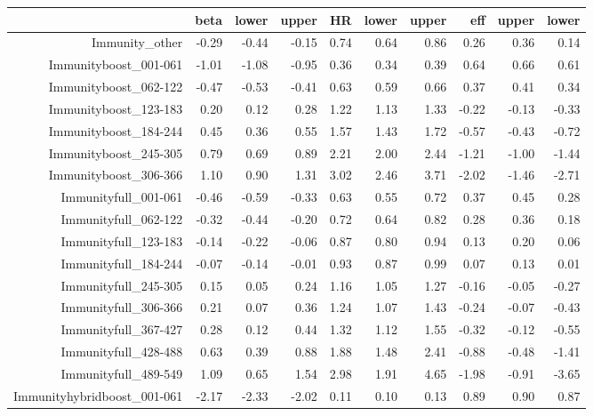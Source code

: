 \begin{table}[ht]
\centering
\begin{tabular}{rrrrrrrrrr}
  \hline
 & beta & lower & upper & HR & lower & upper & eff & upper & lower \\ 
  \hline
Immunity\_other & -0.29 & -0.44 & -0.15 & 0.74 & 0.64 & 0.86 & 0.26 & 0.36 & 0.14 \\ 
  Immunityboost\_001-061 & -1.01 & -1.08 & -0.95 & 0.36 & 0.34 & 0.39 & 0.64 & 0.66 & 0.61 \\ 
  Immunityboost\_062-122 & -0.47 & -0.53 & -0.41 & 0.63 & 0.59 & 0.66 & 0.37 & 0.41 & 0.34 \\ 
  Immunityboost\_123-183 & 0.20 & 0.12 & 0.28 & 1.22 & 1.13 & 1.33 & -0.22 & -0.13 & -0.33 \\ 
  Immunityboost\_184-244 & 0.45 & 0.36 & 0.55 & 1.57 & 1.43 & 1.72 & -0.57 & -0.43 & -0.72 \\ 
  Immunityboost\_245-305 & 0.79 & 0.69 & 0.89 & 2.21 & 2.00 & 2.44 & -1.21 & -1.00 & -1.44 \\ 
  Immunityboost\_306-366 & 1.10 & 0.90 & 1.31 & 3.02 & 2.46 & 3.71 & -2.02 & -1.46 & -2.71 \\ 
  Immunityfull\_001-061 & -0.46 & -0.59 & -0.33 & 0.63 & 0.55 & 0.72 & 0.37 & 0.45 & 0.28 \\ 
  Immunityfull\_062-122 & -0.32 & -0.44 & -0.20 & 0.72 & 0.64 & 0.82 & 0.28 & 0.36 & 0.18 \\ 
  Immunityfull\_123-183 & -0.14 & -0.22 & -0.06 & 0.87 & 0.80 & 0.94 & 0.13 & 0.20 & 0.06 \\ 
  Immunityfull\_184-244 & -0.07 & -0.14 & -0.01 & 0.93 & 0.87 & 0.99 & 0.07 & 0.13 & 0.01 \\ 
  Immunityfull\_245-305 & 0.15 & 0.05 & 0.24 & 1.16 & 1.05 & 1.27 & -0.16 & -0.05 & -0.27 \\ 
  Immunityfull\_306-366 & 0.21 & 0.07 & 0.36 & 1.24 & 1.07 & 1.43 & -0.24 & -0.07 & -0.43 \\ 
  Immunityfull\_367-427 & 0.28 & 0.12 & 0.44 & 1.32 & 1.12 & 1.55 & -0.32 & -0.12 & -0.55 \\ 
  Immunityfull\_428-488 & 0.63 & 0.39 & 0.88 & 1.88 & 1.48 & 2.41 & -0.88 & -0.48 & -1.41 \\ 
  Immunityfull\_489-549 & 1.09 & 0.65 & 1.54 & 2.98 & 1.91 & 4.65 & -1.98 & -0.91 & -3.65 \\ 
  Immunityhybridboost\_001-061 & -2.17 & -2.33 & -2.02 & 0.11 & 0.10 & 0.13 & 0.89 & 0.90 & 0.87 \\ 

\end{tabular}
\end{table}
